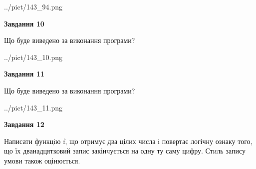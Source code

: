 \documentclass[12pt, ukrainian]{article}
\begin{document}
{\begin {large}
\begin{center}
	{../pict/143_94.png}
\end{center}
\newpage

{\begin {center}\textbf{Завдання 10}\end {center}}

Що буде виведено за виконання програми?\par
\begin{center}
	{../pict/143_10.png}
\end{center}
\newpage

{\begin {center}\textbf{Завдання 11}\end {center}}

Що буде виведено за виконання програми?\par
\begin{center}
	{../pict/143_11.png}
\end{center}
\newpage

{\begin {center}\textbf{Завдання 12}\end {center}}


Написати функцiю f, що отримує два цілих числа i повертає логічну ознаку того, що їх дванадцятковий запис закінчується на одну ту саму цифру. Стиль запису умови також оцінюється.\par
\newpage

\end {large}}
\end{document}
